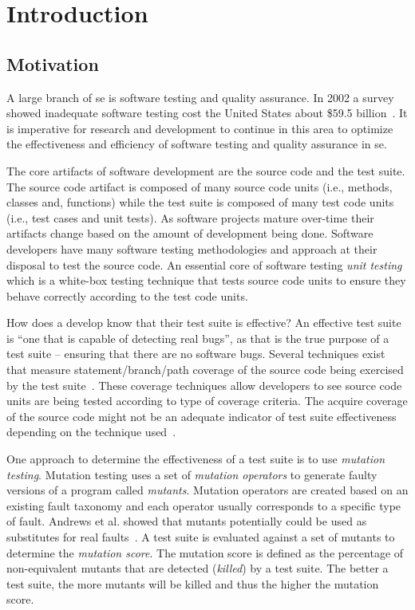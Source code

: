 \chapter{Introduction}
\label{chap:introduction}


\section{Motivation}
\label{sec:introduction_motivation}
A large branch of \gls{se} is software testing and quality assurance. In 2002 a survey showed inadequate software testing cost the United States about \$59.5 billion~\cite{RTI02}. It is imperative for research and development to continue in this area to optimize the effectiveness and efficiency of software testing and quality assurance in \gls{se}.

The core artifacts of software development are the source code and the test suite. The source code artifact is composed of many source code units (i.e., methods, classes and, functions) while the test suite is composed of many test code units (i.e., test cases and unit tests). As software projects mature over-time their artifacts change based on the amount of development being done. Software developers have many software testing methodologies and approach at their disposal to test the source code. An essential core of software testing \emph{unit testing} which is a white-box testing technique that tests source code units to ensure they behave correctly according to the test code units.

How does a develop know that their test suite is effective? An effective test suite is ``one that is capable of detecting real bugs'', as that is the true purpose of a test suite -- ensuring that there are no software bugs. Several techniques exist that measure statement/branch/path coverage of the source code being exercised by the test suite~\cite{ZHM97}. These coverage techniques allow developers to see source code units are being tested according to type of coverage criteria. The acquire coverage of the source code might not be an adequate indicator of test suite effectiveness depending on the technique used~\cite{NA09,GJ08}.

One approach to determine the effectiveness of a test suite is to use \emph{mutation testing}. Mutation testing uses a set of \emph{mutation operators} to generate faulty versions of a program called \emph{mutants}. Mutation operators are created based on an existing fault taxonomy and each operator usually corresponds to a specific type of fault. Andrews et al. showed that mutants potentially could be used as substitutes for real faults~\cite{ABLN06}. A test suite is evaluated against a set of mutants to determine the \emph{mutation score}. The mutation score is defined as the percentage of non-equivalent mutants that are detected (\emph{killed}) by a test suite. The better a test suite, the more mutants will be killed and thus the higher the mutation score.

